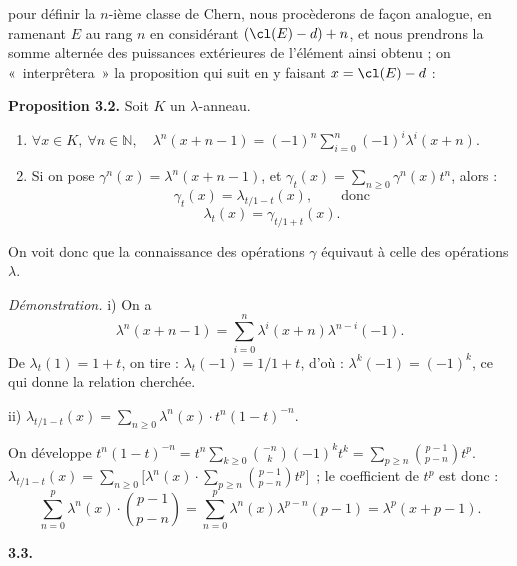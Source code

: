 pour définir la \(n\)-ième classe de Chern, nous procèderons de façon analogue, en ramenant \(E\) au rang \(n\) en considérant \((\cl(E)-d)+n\), et nous prendrons la somme alternée des puissances extérieures de l'élément ainsi obtenu ; on «~interprêtera~» la proposition qui suit en y faisant \(x=\cl(E)-d\) :

\textbf{Proposition 3.2.} Soit \(K\) un \(\lambda\)-anneau.
\begin{enumerate}[label=\roman*)]
\item \(\forall x\in K,\ \forall n\in\mathbb N,\quad \lambda^n(x+n-1)=(-1)^n\sum_{i=0}^n(-1)^i\lambda^i(x+n).\)
\item Si on pose \(\gamma^n(x)=\lambda^n(x+n-1)\), et \(\gamma_t(x)=\sum_{n\ge0}\gamma^n(x)t^n\), alors :
\[
  \gamma_t(x)=\lambda_{t/1-t}(x),\qquad\text{donc}
\]
\[
  \lambda_t(x)=\gamma_{t/1+t}(x).
\]
\end{enumerate}
On voit donc que la connaissance des opérations \(\gamma\) équivaut à celle des opérations \(\lambda\).

\emph{Démonstration.} i) On a
\[
  \lambda^n(x+n-1)=\sum_{i=0}^{n}\lambda^i(x+n)\lambda^{n-i}(-1).
\]
De \(\lambda_t(1)=1+t\), on tire : \(\lambda_t(-1)=1/1+t\), d'où : \(\lambda^k(-1)=(-1)^k\), ce qui donne la relation cherchée.

ii) \(\lambda_{t/1-t}(x)=\sum_{n\ge0}\lambda^n(x)\cdot t^n(1-t)^{-n}.\)

On développe \(t^n(1-t)^{-n}=t^n\sum_{k\ge0}\binom{-n}{k}(-1)^kt^k=\sum_{p\ge n}\binom{p-1}{p-n}t^p\). \(\lambda_{t/1-t}(x)=\sum_{n\ge0}\bigl[\lambda^n(x)\cdot\sum_{p\ge n}\binom{p-1}{p-n}t^p\bigr]\)~; le coefficient de \(t^p\) est donc :
\[
  \sum_{n=0}^{p}\lambda^n(x)\cdot\binom{p-1}{p-n}
  =\sum_{n=0}^{p}\lambda^n(x)\lambda^{p-n}(p-1)
  =\lambda^p(x+p-1).
\]

\textbf{3.3.}
